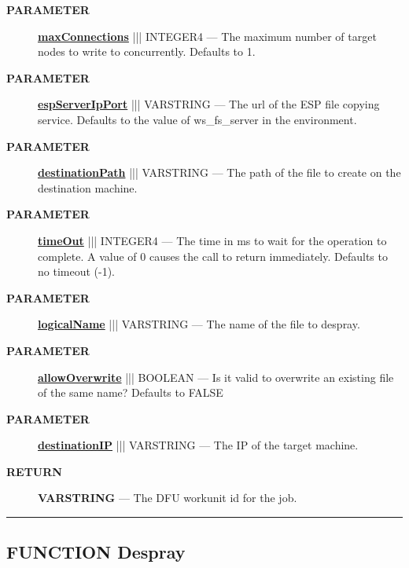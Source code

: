 \par
\begin{description}
\item [\colorbox{tagtype}{\color{white} \textbf{\textsf{PARAMETER}}}] \textbf{\underline{maxConnections}} ||| INTEGER4 --- The maximum number of target nodes to write to concurrently. Defaults to 1.
\item [\colorbox{tagtype}{\color{white} \textbf{\textsf{PARAMETER}}}] \textbf{\underline{espServerIpPort}} ||| VARSTRING --- The url of the ESP file copying service. Defaults to the value of ws\_fs\_server in the environment.
\item [\colorbox{tagtype}{\color{white} \textbf{\textsf{PARAMETER}}}] \textbf{\underline{destinationPath}} ||| VARSTRING --- The path of the file to create on the destination machine.
\item [\colorbox{tagtype}{\color{white} \textbf{\textsf{PARAMETER}}}] \textbf{\underline{timeOut}} ||| INTEGER4 --- The time in ms to wait for the operation to complete. A value of 0 causes the call to return immediately. Defaults to no timeout (-1).
\item [\colorbox{tagtype}{\color{white} \textbf{\textsf{PARAMETER}}}] \textbf{\underline{logicalName}} ||| VARSTRING --- The name of the file to despray.
\item [\colorbox{tagtype}{\color{white} \textbf{\textsf{PARAMETER}}}] \textbf{\underline{allowOverwrite}} ||| BOOLEAN --- Is it valid to overwrite an existing file of the same name? Defaults to FALSE
\item [\colorbox{tagtype}{\color{white} \textbf{\textsf{PARAMETER}}}] \textbf{\underline{destinationIP}} ||| VARSTRING --- The IP of the target machine.
\end{description}







\par
\begin{description}
\item [\colorbox{tagtype}{\color{white} \textbf{\textsf{RETURN}}}] \textbf{VARSTRING} --- The DFU workunit id for the job.
\end{description}




\rule{\linewidth}{0.5pt}
\subsection*{\textsf{\colorbox{headtoc}{\color{white} FUNCTION}
Despray}}

